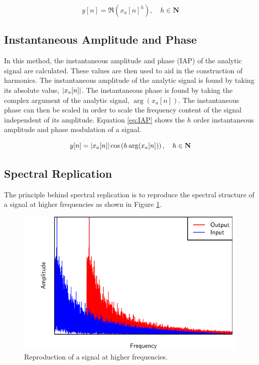 		\begin{equation}
			y[n] = \Re \left( x_{a}[n]^{h} \right), \quad h \in \textbf{N}
			\label{eq:SSB}
		\end{equation}

	\subsection{Instantaneous Amplitude and Phase}
	\label{sec:Excitation-Methods-IAP}
		In this method, the instantaneous amplitude and phase (IAP) of the analytic signal are calculated. These
		values are then used to aid in the construction of harmonics. The instantaneous amplitude of the analytic
		signal is found by taking its absolute value, $\left|x_{a}[n]\right|$. The instantaneous phase is found by taking
		the complex argument of the analytic signal, $\arg(x_{a}[n])$. The instantaneous phase can then be scaled
		in order to scale the frequency content of the signal independent of its amplitude. Equation \ref{eq:IAP}
		shows the $h$ order instantaneous amplitude and phase modulation of a signal.

		\begin{equation}
			y[n] = \left|x_{a}[n]\right| \cos \left( h\arg(x_{a}[n]) \right), \quad h \in \textbf{N}
			\label{eq:IAP}
		\end{equation}

	\subsection{Spectral Replication}
	\label{sec:Excitation-Methods-SpectralReplication}
		The principle behind spectral replication is to reproduce the spectral structure of a signal at higher
		frequencies as shown in Figure \ref{fig:SpectralReplication}.

		\begin{figure}[h!]
			\centering
			\includegraphics{chapter3/Images/SpectralReplicationSpectrum.pdf}
			\caption{Reproduction of a signal at higher frequencies.}
			\label{fig:SpectralReplication}
		\end{figure}

